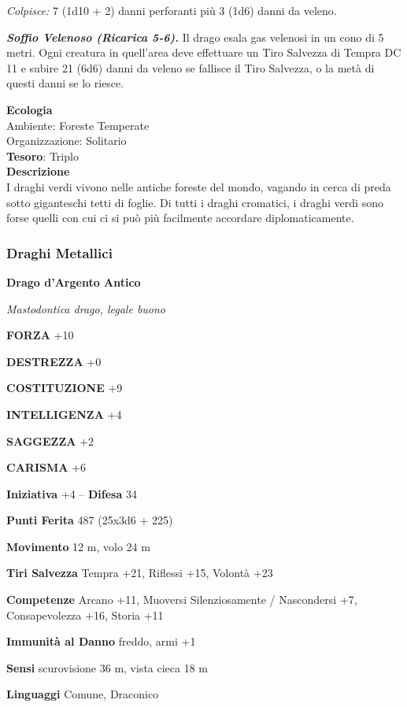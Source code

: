 \begin{multicols}{2}
	\textit{Colpisce:} 7 (1d10 + 2) danni perforanti più 3 (1d6) danni da veleno.

	\textit{\textbf{Soffio Velenoso (Ricarica 5-6).}} Il drago esala gas velenosi in un cono di 5 metri. Ogni creatura in quell'area deve effettuare un Tiro Salvezza di Tempra DC 11 e subire 21 (6d6) danni da veleno se fallisce il Tiro Salvezza, o la metà di questi danni se lo riesce.

	\textbf{Ecologia}\\
	Ambiente: Foreste Temperate\\
	Organizzazione: Solitario\\
	\textbf{Tesoro}: Triplo\\
	\textbf{Descrizione}\\
	I draghi verdi vivono nelle antiche foreste del mondo, vagando in cerca di preda sotto giganteschi tetti di foglie. Di tutti i draghi cromatici, i draghi verdi sono forse quelli con cui ci si può più facilmente accordare diplomaticamente.


	\subsubsection{Draghi Metallici}

	\medskip{}\textbf{Drago d'Argento Antico}

	\textit{Mastodontica drago, legale buono}

	\textbf{FORZA} +10

	\textbf{DESTREZZA} +0

	\textbf{COSTITUZIONE} +9

	\textbf{INTELLIGENZA} +4

	\textbf{SAGGEZZA} +2

	\textbf{CARISMA} +6

	\textbf{Iniziativa} +4 -- \textbf{Difesa} 34

	\textbf{Punti Ferita} 487 (25x3d6 + 225)

	\textbf{Movimento} 12 m, volo 24 m

	\textbf{Tiri Salvezza} Tempra +21, Riflessi +15, Volontà +23

	\textbf{Competenze} Arcano +11, Muoversi Silenziosamente / Nascondersi +7, Consapevolezza +16, Storia +11

	\textbf{Immunità al Danno} freddo, armi +1

	\textbf{Sensi} scurovisione 36 m, vista cieca 18 m

	\textbf{Linguaggi} Comune, Draconico


\end{multicols}
